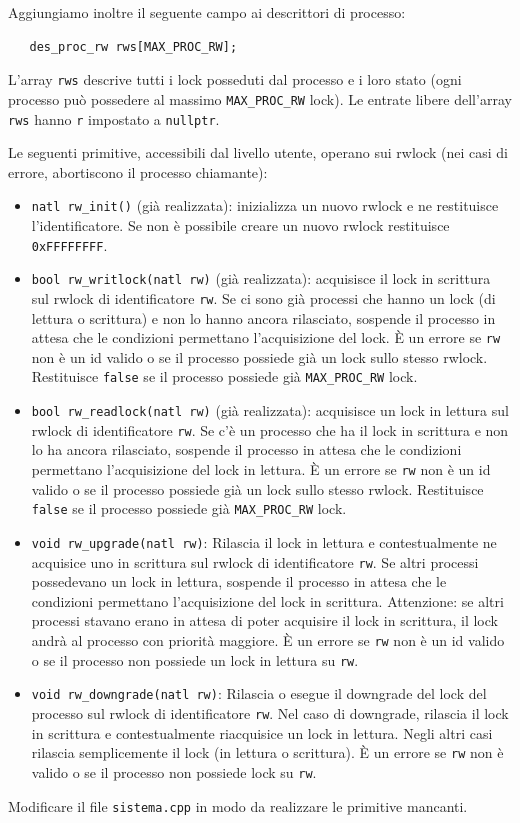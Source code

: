 Aggiungiamo inoltre il seguente campo ai descrittori di processo:
\begin{verbatim}
   des_proc_rw rws[MAX_PROC_RW];
\end{verbatim}
L'array \verb|rws| descrive tutti i lock posseduti dal processo e i loro stato
(ogni processo pu\`o possedere al massimo \verb|MAX_PROC_RW| lock).
Le entrate libere dell'array \verb|rws| hanno \verb|r| impostato a \verb|nullptr|.

Le seguenti primitive, accessibili dal livello utente, operano sui
rwlock (nei casi di errore, abortiscono il processo chiamante):
\begin{itemize}
\item \verb|natl rw_init()| (gi\`a realizzata):
  inizializza un nuovo rwlock e ne restituisce l'identificatore.
Se non \`e possibile creare un nuovo rwlock restituisce {\tt 0xFFFFFFFF}.
\item \verb|bool rw_writlock(natl rw)| (gi\`a
realizzata): acquisisce il lock in scrittura sul rwlock di identificatore
{\tt rw}.  Se ci sono gi\`a processi che hanno un lock (di lettura o scrittura) e non lo hanno
ancora rilasciato, sospende il processo in attesa che le condizioni permettano 
l'acquisizione del lock.
\`E un errore se \verb|rw| non \`e un id valido o se il processo possiede gi\`a un lock sullo stesso rwlock.
Restituisce \verb|false| se il processo possiede gi\`a \verb|MAX_PROC_RW| lock.
\item \verb|bool rw_readlock(natl rw)| (gi\`a realizzata):
acquisisce un lock in lettura sul rwlock di identificatore {\tt rw}.
Se c'\`e un processo che ha il lock in scrittura e non lo ha ancora
rilasciato, sospende il processo in attesa che le condizioni permettano l'acquisizione del lock in lettura.
\`E un errore se \verb|rw| non \`e un id valido o se il processo possiede gi\`a un lock sullo stesso rwlock.
Restituisce \verb|false| se il processo possiede gi\`a \verb|MAX_PROC_RW| lock.
\item \verb|void rw_upgrade(natl rw)|: 
Rilascia il lock in lettura e contestualmente ne acquisice uno in scrittura sul rwlock di identificatore
\verb|rw|. Se altri processi possedevano un lock in lettura, sospende il processo in attesa che
le condizioni permettano l'acquisizione del lock in scrittura. Attenzione: se altri processi stavano
erano in attesa di poter acquisire il lock in scrittura, il lock andr\`a al processo con priorit\`a
maggiore.
\`E un errore se \verb|rw| non \`e un id valido o se il processo non possiede un lock in lettura
su \verb|rw|.
\item \verb|void rw_downgrade(natl rw)|:
Rilascia o esegue il downgrade del lock del processo sul rwlock di identificatore \verb|rw|.
Nel caso di downgrade, rilascia il lock in scrittura e contestualmente riacquisice un lock in lettura.
Negli altri casi rilascia semplicemente il lock (in lettura o scrittura).
\`E un errore se \verb|rw| non \`e valido o se il processo non possiede lock su \verb|rw|.
\end{itemize}

Modificare il file \verb|sistema.cpp| in modo da realizzare le primitive mancanti.

